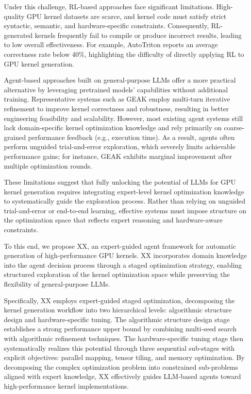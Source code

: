 Under this challenge, RL-based approaches face significant limitations. High-quality GPU kernel datasets are scarce, and kernel code must satisfy strict syntactic, semantic, and hardware-specific constraints. Consequently, RL-generated kernels frequently fail to compile or produce incorrect results, leading to low overall effectiveness. For example, AutoTriton reports an average correctness rate below 40\%, highlighting the difficulty of directly applying RL to GPU kernel generation.

Agent-based approaches built on general-purpose LLMs offer a more practical alternative by leveraging pretrained models' capabilities without additional training. Representative systems such as GEAK employ multi-turn iterative refinement to improve kernel correctness and robustness, resulting in better engineering feasibility and scalability. However, most existing agent systems still lack domain-specific kernel optimization knowledge and rely primarily on coarse-grained performance feedback (e.g., execution time). As a result, agents often perform unguided trial-and-error exploration, which severely limits achievable performance gains; for instance, GEAK exhibits marginal improvement after multiple optimization rounds.

These limitations suggest that fully unlocking the potential of LLMs for GPU kernel generation requires integrating expert-level kernel optimization knowledge to systematically guide the exploration process. Rather than relying on unguided trial-and-error or end-to-end learning, effective systems must impose structure on the optimization space that reflects expert reasoning and hardware-aware constraints.

 To this end, we propose XX, an expert-guided agent framework for automatic generation of high-performance GPU kernels. XX incorporates domain knowledge into the agent decision process through a staged optimization strategy, enabling structured exploration of the kernel optimization space while preserving the flexibility of general-purpose LLMs.

 Specifically, XX employs expert-guided staged optimization, decomposing the kernel generation workflow into two hierarchical levels: algorithmic structure design and hardware-specific tuning. The algorithmic structure design stage establishes a strong performance upper bound by combining multi-seed search with algorithmic refinement techniques. The hardware-specific tuning stage then systematically realizes this potential through three sequential sub-stages with explicit objectives: parallel mapping, tensor tiling, and memory optimization. By decomposing the complex optimization problem into constrained sub-problems aligned with expert knowledge, XX effectively guides LLM-based agents toward high-performance kernel implementations.

